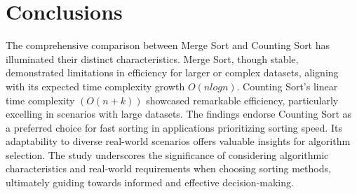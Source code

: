 \documentclass[12pt,twocolumn]{article}
\begin{document}
\section{Conclusions}
The comprehensive comparison between Merge Sort and Counting Sort has illuminated their distinct characteristics. Merge Sort, though stable, demonstrated limitations in efficiency for larger or complex datasets, aligning with its expected time complexity growth \(O(nlogn)\). Counting Sort's linear time complexity \((O(n+k))\) showcased remarkable efficiency, particularly excelling in scenarios with large datasets. The findings endorse Counting Sort as a preferred choice for fast sorting in applications prioritizing sorting speed. Its adaptability to diverse real-world scenarios offers valuable insights for algorithm selection. The study underscores the significance of considering algorithmic characteristics and real-world requirements when choosing sorting methods, ultimately guiding towards informed and effective decision-making.



\end{document}
